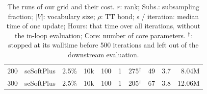 \begin{table}[t]
\begin{tabular}{rlrrrrrrrr}
    200 & scSoftPlus & 2.5\% & 10k & 100 & 1 & 275$^\dagger$ & 49 & 3.7 & 8.04M \\
    300 & scSoftPlus & 2.5\% & 10k & 100 & 1 & 205$^\dagger$ & 67 & 3.8 & 12.06M \\
    \bottomrule
  \end{tabular}
  \caption{The runs of our grid and their cost. $r$: rank; Subs.: subsampling fraction; $|V|$: vocabulary size; $\rho$: TT bond; s / iteration: median time of one update; Hours: that time over all iterations, without the in-loop evaluation; Core: number of core parameters. $^\dagger$: stopped at its walltime before 500 iterations and left out of the downstream evaluation.}
  \label{tab:grid}
\end{table}
